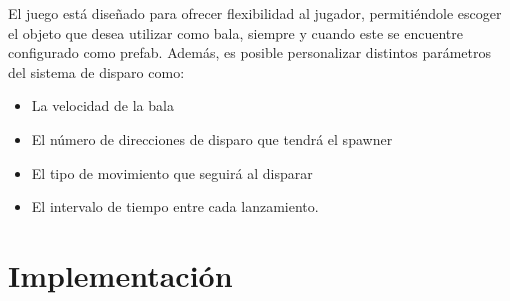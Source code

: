 \documentclass[11pt]{article}
\begin{document}
\vspace{0.5cm} 

El juego está diseñado para ofrecer flexibilidad al jugador, permitiéndole escoger el objeto que desea utilizar como bala, siempre y cuando este se encuentre configurado como prefab. Además, es posible personalizar distintos parámetros del sistema de disparo como:

\begin{itemize}
\item La velocidad de la bala
\item El número de direcciones de disparo que tendrá el spawner
\item El tipo de movimiento que seguirá al disparar 
\item El intervalo de tiempo entre cada lanzamiento.
\end{itemize}

\section*{Implementación}
\end{document}
